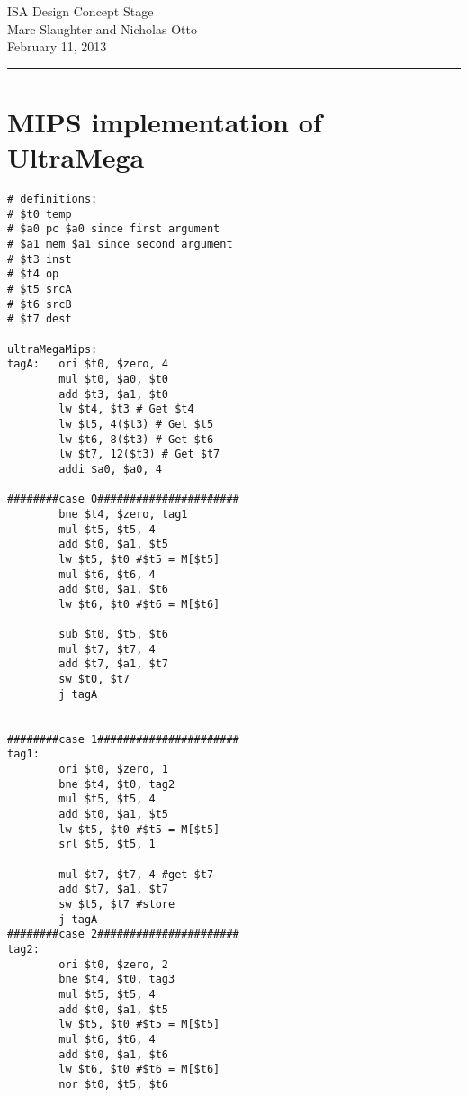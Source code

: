 \documentclass{article}
\begin{document}
\begin{center}
ISA Design Concept Stage\\
Marc Slaughter and Nicholas Otto\\
February 11, 2013\\
\vspace{1.5em}
\hrule
\end{center}

\section{MIPS implementation of UltraMega}
\begin{verbatim}
# definitions:
# $t0 temp
# $a0 pc $a0 since first argument
# $a1 mem $a1 since second argument
# $t3 inst
# $t4 op
# $t5 srcA
# $t6 srcB
# $t7 dest

ultraMegaMips:
tagA:   ori $t0, $zero, 4
        mul $t0, $a0, $t0
        add $t3, $a1, $t0
        lw $t4, $t3 # Get $t4
        lw $t5, 4($t3) # Get $t5
        lw $t6, 8($t3) # Get $t6
        lw $t7, 12($t3) # Get $t7
        addi $a0, $a0, 4

########case 0######################
        bne $t4, $zero, tag1
        mul $t5, $t5, 4
        add $t0, $a1, $t5
        lw $t5, $t0 #$t5 = M[$t5]
        mul $t6, $t6, 4
        add $t0, $a1, $t6
        lw $t6, $t0 #$t6 = M[$t6]

        sub $t0, $t5, $t6
        mul $t7, $t7, 4
        add $t7, $a1, $t7
        sw $t0, $t7
        j tagA
        
        
########case 1######################
tag1:
        ori $t0, $zero, 1
        bne $t4, $t0, tag2
        mul $t5, $t5, 4
        add $t0, $a1, $t5
        lw $t5, $t0 #$t5 = M[$t5]
        srl $t5, $t5, 1

        mul $t7, $t7, 4 #get $t7
        add $t7, $a1, $t7
        sw $t5, $t7 #store
        j tagA
########case 2######################
tag2:
        ori $t0, $zero, 2
        bne $t4, $t0, tag3
        mul $t5, $t5, 4
        add $t0, $a1, $t5
        lw $t5, $t0 #$t5 = M[$t5]
        mul $t6, $t6, 4
        add $t0, $a1, $t6
        lw $t6, $t0 #$t6 = M[$t6]
        nor $t0, $t5, $t6
        

\end{verbatim}
\end{document}
